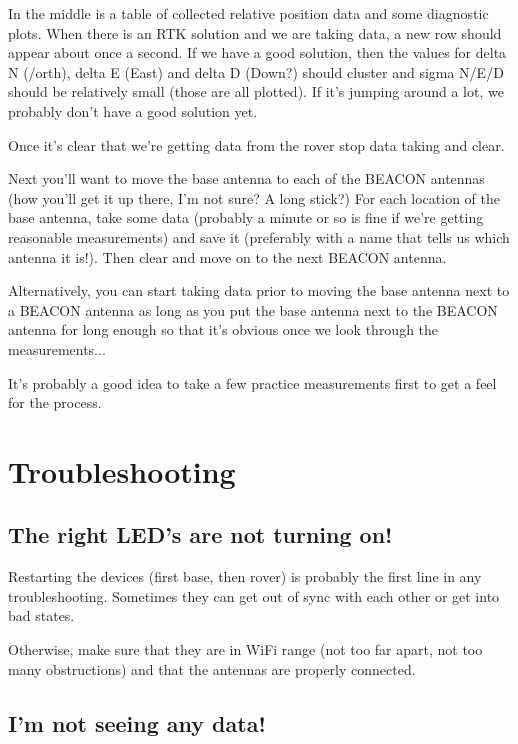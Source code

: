 \documentclass[usletter]{article}
\begin{document}
In the middle is a table of collected relative position data and some diagnostic plots. When there is an RTK solution and we are taking data, a new row should appear about once a second. If we have a good solution, then the values for delta N (/orth), delta E (East) and delta D (Down?) should cluster and sigma N/E/D should be relatively small (those are all plotted). If it's jumping around a lot, we probably don't have a good solution yet. 

Once it's clear that we're getting data from the rover stop data taking and clear. 

Next you'll want to move the base antenna to each of the BEACON antennas (how
you'll get it up there, I'm not sure? A long stick?) For each location of the
base antenna, take some data (probably a minute or so is fine if we're getting
reasonable measurements) and save it (preferably with a name that tells us
which antenna it is!). Then clear and move on to the next BEACON antenna. 

Alternatively, you can start taking data prior to moving the base antenna next
to a BEACON antenna as long as you put the base antenna next to the BEACON
antenna for long enough so that it's obvious once we look through the measurements... 

It's probably a good idea to take a few practice measurements first to get a feel for the process. 

\section{Troubleshooting} 

\subsection{The right LED's are not turning on!} 

Restarting the devices (first base, then rover) is probably the first line in any troubleshooting. Sometimes they can get out of sync with each other or get into bad states. 

Otherwise, make sure that they are in WiFi range (not too far apart, not too many obstructions) and that the antennas are properly connected. 

\subsection{I'm not seeing any data!}
\end{document}
